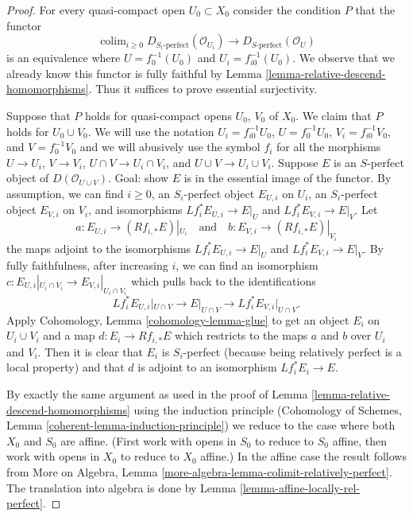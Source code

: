 \documentclass{stacks-project}
\theoremstyle{plain}
\theoremstyle{definition}
\theoremstyle{remark}
\numberwithin{equation}{subsection}
\def\colim{\mathop{\mathrm{colim}}\nolimits}
\begin{document}
\begin{proof}
For every quasi-compact open $U_0 \subset X_0$ consider the condition $P$
that the functor
$$
\colim_{i \geq 0} D_{S_i\text{-perfect}}(\mathcal{O}_{U_i})
\longrightarrow
D_{S\text{-perfect}}(\mathcal{O}_U)
$$
is an equivalence where $U = f_0^{-1}(U_0)$ and $U_i = f_{i0}^{-1}(U_0)$.
We observe that we already know this functor is fully faithful
by Lemma \ref{lemma-relative-descend-homomorphisms}. Thus it suffices to prove
essential surjectivity.

\medskip\noindent
Suppose that $P$ holds for quasi-compact opens $U_0$, $V_0$ of $X_0$.
We claim that $P$ holds for $U_0 \cup V_0$. We will use the notation
$U_i = f_{i0}^{-1}U_0$, $U = f_0^{-1}U_0$, $V_i = f_{i0}^{-1}V_0$,
and $V = f_0^{-1}V_0$ and we will abusively use the symbol
$f_i$ for all the morphisms $U \to U_i$, $V \to V_i$,
$U \cap V \to U_i \cap V_i$, and $U \cup V \to U_i \cup V_i$.
Suppose $E$ is an $S$-perfect object of $D(\mathcal{O}_{U \cup V})$.
Goal: show $E$ is in the essential image of the functor.
By assumption,
we can find $i \geq 0$, an $S_i$-perfect object $E_{U, i}$ on $U_i$,
an $S_i$-perfect object $E_{V, i}$ on $V_i$, and
isomorphisms $Lf_i^*E_{U, i} \to E|_U$ and $Lf_i^*E_{V, i} \to E|_V$.
Let
$$
a : E_{U, i} \to (Rf_{i, *}E)|_{U_i}
\quad\text{and}\quad
b : E_{V, i} \to (Rf_{i, *}E)|_{V_i}
$$
the maps adjoint to the isomorphisms $Lf_i^*E_{U, i} \to E|_U$
and $Lf_i^*E_{V, i} \to E|_V$.
By fully faithfulness, after increasing $i$,
we can find an isomorphism
$c : E_{U, i}|_{U_i \cap V_i} \to E_{V, i}|_{U_i \cap V_i}$
which pulls back to the identifications 
$$
Lf_i^*E_{U, i}|_{U \cap V} \to E|_{U \cap V} \to Lf_i^*E_{V, i}|_{U \cap V}.
$$
Apply Cohomology, Lemma \ref{cohomology-lemma-glue}
to get an object $E_i$ on $U_i \cup V_i$ and a map $d : E_i \to Rf_{i, *}E$
which restricts to the maps $a$ and $b$ over $U_i$ and $V_i$.
Then it is clear that $E_i$ is $S_i$-perfect (because being
relatively perfect is a local property) and that
$d$ is adjoint to an isomorphism $Lf_i^*E_i \to E$.

\medskip\noindent
By exactly the same argument as used in
the proof of Lemma \ref{lemma-relative-descend-homomorphisms}
using the induction principle
(Cohomology of Schemes, Lemma \ref{coherent-lemma-induction-principle})
we reduce to the case where both $X_0$ and $S_0$
are affine. (First work with opens in $S_0$ to reduce to
$S_0$ affine, then work with opens in $X_0$ to reduce to
$X_0$ affine.) In the affine case the result follows from
More on Algebra, Lemma \ref{more-algebra-lemma-colimit-relatively-perfect}.
The translation into algebra is done by
Lemma \ref{lemma-affine-locally-rel-perfect}.
\end{proof}
\end{document}
